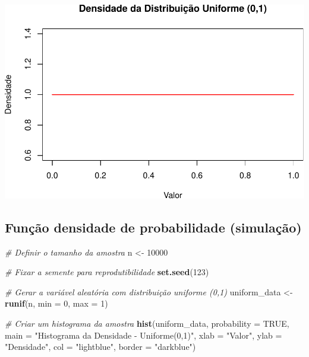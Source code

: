 \documentclass[
]{book}
\newenvironment{Shaded}{\begin{snugshade}}{\end{snugshade}}
\newcommand{\AttributeTok}[1]{\textcolor[rgb]{0.13,0.29,0.53}{#1}}
\newcommand{\CommentTok}[1]{\textcolor[rgb]{0.56,0.35,0.01}{\textit{#1}}}
\newcommand{\ConstantTok}[1]{\textcolor[rgb]{0.56,0.35,0.01}{#1}}
\newcommand{\DecValTok}[1]{\textcolor[rgb]{0.00,0.00,0.81}{#1}}
\newcommand{\FunctionTok}[1]{\textcolor[rgb]{0.13,0.29,0.53}{\textbf{#1}}}
\newcommand{\NormalTok}[1]{#1}
\newcommand{\OtherTok}[1]{\textcolor[rgb]{0.56,0.35,0.01}{#1}}
\newcommand{\StringTok}[1]{\textcolor[rgb]{0.31,0.60,0.02}{#1}}
\theoremstyle{definition}
\theoremstyle{definition}
\theoremstyle{definition}
\theoremstyle{definition}
\theoremstyle{remark}
\begin{document}
\includegraphics{meuLivro2_files/figure-latex/unnamed-chunk-118-1.pdf}

\subsection{Função densidade de probabilidade (simulação)}\label{funuxe7uxe3o-densidade-de-probabilidade-simulauxe7uxe3o}

\begin{Shaded}
\begin{Highlighting}[]
\CommentTok{\# Definir o tamanho da amostra}
\NormalTok{n }\OtherTok{\textless{}{-}} \DecValTok{10000}

\CommentTok{\# Fixar a semente para reprodutibilidade}
\FunctionTok{set.seed}\NormalTok{(}\DecValTok{123}\NormalTok{)}

\CommentTok{\# Gerar a variável aleatória com distribuição uniforme (0,1)}
\NormalTok{uniform\_data }\OtherTok{\textless{}{-}} \FunctionTok{runif}\NormalTok{(n, }\AttributeTok{min =} \DecValTok{0}\NormalTok{, }\AttributeTok{max =} \DecValTok{1}\NormalTok{)}

\CommentTok{\# Criar um histograma da amostra }
\FunctionTok{hist}\NormalTok{(uniform\_data, }\AttributeTok{probability =} \ConstantTok{TRUE}\NormalTok{, }
     \AttributeTok{main =} \StringTok{"Histograma da Densidade {-} Uniforme(0,1)"}\NormalTok{, }
     \AttributeTok{xlab =} \StringTok{"Valor"}\NormalTok{, }
     \AttributeTok{ylab =} \StringTok{"Densidade"}\NormalTok{, }
     \AttributeTok{col =} \StringTok{"lightblue"}\NormalTok{, }
     \AttributeTok{border =} \StringTok{"darkblue"}\NormalTok{)}
\end{Highlighting}
\end{Shaded}
\end{document}
